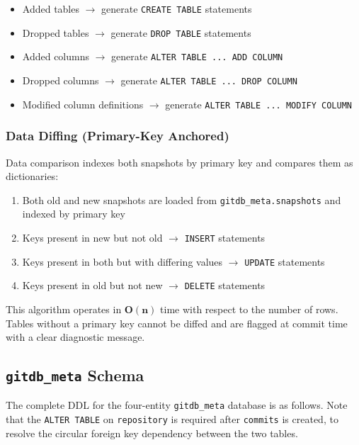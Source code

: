 \documentclass[12pt, a4paper]{article}
\begin{document}
\begin{itemize}[leftmargin=1.5em, itemsep=0.3em]
    \item Added tables $\rightarrow$ generate \texttt{CREATE TABLE} statements
    \item Dropped tables $\rightarrow$ generate \texttt{DROP TABLE} statements
    \item Added columns $\rightarrow$ generate \texttt{ALTER TABLE ... ADD COLUMN}
    \item Dropped columns $\rightarrow$ generate \texttt{ALTER TABLE ... DROP COLUMN}
    \item Modified column definitions $\rightarrow$ generate
    \texttt{ALTER TABLE ... MODIFY COLUMN}
\end{itemize}

\subsubsection{Data Diffing (Primary-Key Anchored)}

Data comparison indexes both snapshots by primary key and compares them as
dictionaries:

\begin{enumerate}[leftmargin=1.5em, itemsep=0.3em]
    \item Both old and new snapshots are loaded from \texttt{gitdb\_meta.snapshots}
    and indexed by primary key
    \item Keys present in new but not old $\rightarrow$ \texttt{INSERT} statements
    \item Keys present in both but with differing values $\rightarrow$
    \texttt{UPDATE} statements
    \item Keys present in old but not new $\rightarrow$ \texttt{DELETE} statements
\end{enumerate}

This algorithm operates in $\mathbf{O(n)}$ time with respect to the number of
rows. Tables without a primary key cannot be diffed and are flagged at commit
time with a clear diagnostic message.

\subsection{\texttt{gitdb\_meta} Schema}

The complete DDL for the four-entity \texttt{gitdb\_meta} database is as follows.
Note that the \texttt{ALTER TABLE} on \texttt{repository} is required after
\texttt{commits} is created, to resolve the circular foreign key dependency
between the two tables.
\end{document}
